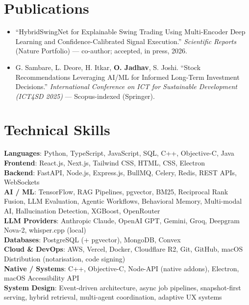 \documentclass[a4paper,11pt]{article}
\begin{document}
\section{Publications}
\begin{itemize}
  \item ``HybridSwingNet for Explainable Swing Trading Using Multi-Encoder Deep Learning and Confidence-Calibrated Signal Execution.'' \textit{Scientific Reports} (Nature Portfolio) --- co-author; accepted, in press, 2026.
  \item G. Sambare, L. Deore, H. Itkar, \textbf{O. Jadhav}, S. Joshi. ``Stock Recommendations Leveraging AI/ML for Informed Long-Term Investment Decisions.'' \textit{International Conference on ICT for Sustainable Development (ICT4SD 2025)} --- Scopus-indexed (Springer).
\end{itemize}

\section{Technical Skills}
\noindent
\textbf{Languages}: Python, TypeScript, JavaScript, SQL, C++, Objective-C, Java\\
\textbf{Frontend}: React.js, Next.js, Tailwind CSS, HTML, CSS, Electron\\
\textbf{Backend}: FastAPI, Node.js, Express.js, BullMQ, Celery, Redis, REST APIs, WebSockets\\
\textbf{AI / ML}: TensorFlow, RAG Pipelines, pgvector, BM25, Reciprocal Rank Fusion, LLM Evaluation, Agentic Workflows, Behavioral Memory, Multi-modal AI, Hallucination Detection, XGBoost, OpenRouter\\
\textbf{LLM Providers}: Anthropic Claude, OpenAI GPT, Gemini, Groq, Deepgram Nova-2, whisper.cpp (local)\\
\textbf{Databases}: PostgreSQL (+ pgvector), MongoDB, Convex\\
\textbf{Cloud \& DevOps}: AWS, Vercel, Docker, Cloudflare R2, Git, GitHub, macOS Distribution (notarisation, code signing)\\
\textbf{Native / Systems}: C++, Objective-C, Node-API (native addons), Electron, macOS Accessibility API\\
\textbf{System Design}: Event-driven architecture, async job pipelines, snapshot-first serving, hybrid retrieval, multi-agent coordination, adaptive UX systems
\end{document}
